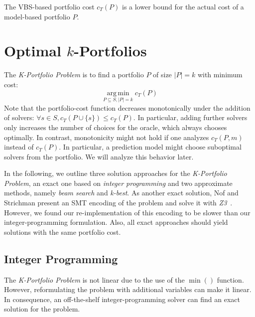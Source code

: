 \documentclass[a4paper,USenglish,pdfa]{lipics-v2021} %
\DeclareMathOperator*{\argmin}{arg\,min}
\begin{document}
The VBS-based portfolio cost $c_{T}(P)$ is a lower bound for the actual cost of a model-based portfolio $P$.

\section{Optimal \texorpdfstring{$k$}{k}-Portfolios} %
\label{sec:approach}

The \emph{K-Portfolio Problem} is to find a portfolio $P$ of size $|P| = k$ with minimum cost:%
\[
\argmin\limits_{P \subseteq S, |P| = k} c_{T}(P)
\]
Note that the portfolio-cost function decreases monotonically under the addition of solvers: $\forall s \in S, c_{T}(P \cup \{s\}) \leq c_{T}(P)$. 
In particular, adding further solvers only increases the number of choices for the oracle, which always chooses optimally.
In contrast, monotonicity might not hold if one analyzes $c_{T}(P,m)$ instead of $c_{T}(P)$.
In particular, a prediction model might choose suboptimal solvers from the portfolio.
We will analyze this behavior later.

In the following, we outline three solution approaches for the \emph{K-Portfolio Problem}, an exact one based on \emph{integer programming} and two approximate methods, namely \emph{beam search} and \emph{k-best}. 
As another exact solution, Nof and Strichman present an SMT encoding of the problem and solve it with \emph{Z3}~\cite{nof2020real}.
However, we found our re-implementation of this encoding to be slower than our integer-programming formulation.
Also, all exact approaches should yield solutions with the same portfolio cost.

\subsection{Integer Programming}
\label{sec:approach:ip}

The \emph{K-Portfolio Problem} is not linear due to the use of the $\min()$ function.
However, reformulating the problem with additional variables can make it linear.
In consequence, an off-the-shelf integer-programming solver can find an exact solution for the problem.
\end{document}
